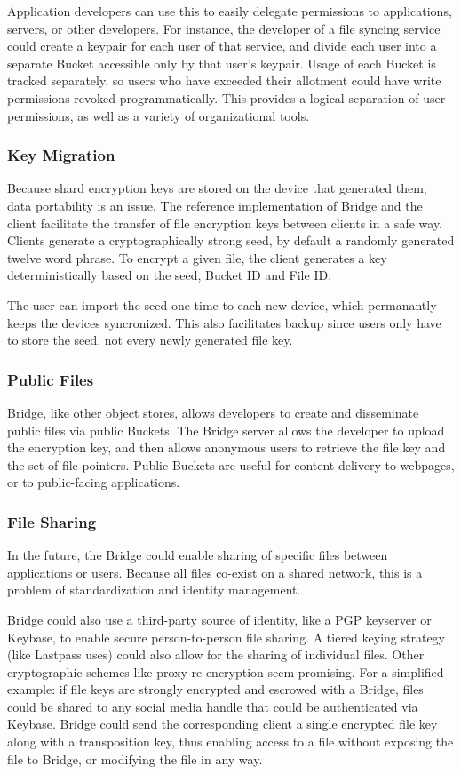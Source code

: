\documentclass[a4paper,10pt]{article}
\begin{document}
Application developers can use this to easily delegate permissions to applications, servers, or  other developers. For instance, the developer of a file syncing service could create a keypair for each user of that service, and divide each user into a separate Bucket accessible only by that user’s keypair. Usage of each Bucket is tracked separately, so users who have exceeded their allotment could have write permissions revoked programmatically. This provides a logical separation of user permissions, as well as a variety of organizational tools.

\subsubsection{Key Migration}
Because shard encryption keys are stored on the device that generated them, data portability is an issue. The reference implementation of Bridge and the client facilitate the transfer of file encryption keys between clients in a safe way. Clients generate a cryptographically strong seed, by default a randomly generated twelve word phrase. To encrypt a given file, the client generates a key deterministically based on the seed, Bucket ID and File ID.

The user can import the seed one time to each new device, which permanantly keeps the devices syncronized. This also facilitates backup since users only have to store the seed, not every newly generated file key.

\subsubsection{Public Files}
Bridge, like other object stores, allows developers to create and disseminate public files via public Buckets. The Bridge server allows the developer to upload the encryption key, and then allows anonymous users to retrieve the file key and the set of file pointers. Public Buckets are useful for content delivery to webpages, or to public-facing applications.

\subsubsection{File Sharing}
In the future, the Bridge could enable sharing of specific files between applications or users. Because all files co-exist on a shared network, this is a problem of standardization and identity management.

Bridge could also use a third-party source of identity, like a PGP keyserver or Keybase, to enable secure person-to-person file sharing. A tiered keying strategy (like Lastpass uses) could also allow for the sharing of individual files. Other cryptographic schemes like proxy re-encryption seem promising. For a simplified example: if file keys are strongly encrypted and escrowed with a Bridge, files could be shared to any social media handle that could be authenticated via Keybase. Bridge could send the corresponding client a single encrypted file key along with a transposition key, thus enabling access to a file without exposing the file to Bridge, or modifying the file in any way.
\end{document}
